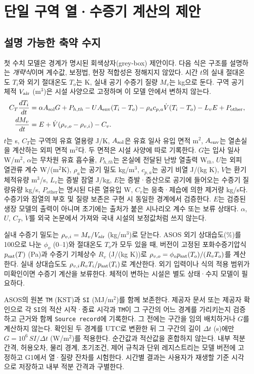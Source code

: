 \documentclass[11pt,a4paper]{article}
\begin{document}
\section{단일 구역 열·수증기 계산의 제안}
\subsection{설명 가능한 축약 수지}
첫 수치 모델은 경계가 명시된 회색상자(grey-box) 제안이다. 다음 식은 구조를 설명하는 \emph{개략식}이며 계수값, 보정법, 현장 적합성은 정해지지 않았다. 시간 $t$의 실내 절대온도 $T_i$와 외기 절대온도 $T_o$는 K, 실내 공기 수증기 질량 $M_v$는 kg으로 둔다. 구역 공기 체적 $V_{\rm air}$ (m$^3$)은 시설 사양으로 고정하며 이 모델 안에서 변하지 않는다.
\begin{align}
C_T\frac{dT_i}{dt}
 &= \alpha A_{\rm sol} G + P_{h,th} - U A_{\rm env}(T_i-T_o)
    - \rho_a c_{p,a}\dot V(T_i-T_o) - L_v E + P_{\mathrm{other}}, \label{eq:heat}\\
\frac{dM_v}{dt}
 &= E + \dot V(\rho_{v,o}-\rho_{v,i}) - C_v. \label{eq:vapor}
\end{align}
$t$는 s, $C_T$는 구역의 유효 열용량 J/K, $A_{\rm sol}$은 유효 일사 유입 면적 m$^2$, $A_{\rm env}$는 열손실을 계산하는 외피 면적 m$^2$다. 두 면적은 시설 사양에 따로 기록한다. $G$는 입사 일사 W/m$^2$, $\alpha$는 무차원 유효 흡수율, $P_{h,th}$는 온실에 전달된 난방 열출력 W$_{th}$, $U$는 외피 열관류 계수 W/(m$^2$K), $\rho_a$는 공기 밀도 kg/m$^3$, $c_{p,a}$는 공기 비열 J/(kg K), $\dot V$는 환기 체적유량 m$^3$/s, $L_v$는 증발 잠열 J/kg, $E$는 증발·증산으로 공기에 들어오는 수증기 질량유량 kg/s, $P_{\mathrm{other}}$는 명시된 다른 열유입 W, $C_v$는 응축·제습에 의한 제거량 kg/s다. 수증기와 잠열의 부호 및 질량 보존은 구현 시 동일한 경계에서 검증한다. $E$는 검증된 생장 모델의 출력이 아니며 초기에는 출처가 붙은 시나리오 계수 또는 보류 상태다. $\alpha$, $U$, $C_T$, $\dot V$를 외국 논문에서 가져와 국내 시설의 보정값처럼 쓰지 않는다.

실내 수증기 밀도는 $\rho_{v,i}=M_v/V_{\rm air}$ (kg/m$^3$)로 닫는다. ASOS 외기 상대습도(\%)를 100으로 나눈 $\phi_o$ (0--1)와 절대온도 $T_o$가 모두 있을 때, 버전이 고정된 포화수증기압식 $p_{\rm sat}(T)$ (Pa)과 수증기 기체상수 $R_v$ (J/(kg K))로 $\rho_{v,o}=\phi_o p_{\rm sat}(T_o)/(R_vT_o)$를 계산한다. 실내 상대습도도 $\rho_{v,i}R_vT_i/p_{\rm sat}(T_i)$로 계산한다. 외기 입력이나 식의 적용 범위가 미확인이면 수증기 계산을 보류한다. 체적이 변하는 시설은 별도 상태·수지 모델이 필요하다.

ASOS의 원본 \texttt{TM} (KST)과 \texttt{SI} (MJ/m$^2$)를 함께 보존한다\cite{kma-api}. 제공자 문서 또는 제공자 확인으로 각 \texttt{SI}의 적산 시작·종료 시각과 \texttt{TM}이 그 구간의 어느 경계를 가리키는지 검증하고 근거와 함께 \texttt{Source record}에 기록한다. 그 전에는 구간을 임의 배치하거나 $G$를 계산하지 않는다. 확인된 두 경계를 UTC로 변환한 뒤 그 구간의 길이 $\Delta t$ (s)에만 $G=10^6\,SI/\Delta t$ (W/m$^2$)를 적용한다. 순간값과 적산값을 혼합하지 않는다. 내부 적분 간격, 허용오차, 물리 경계, 초기조건, 제어 규칙과 단위 레지스트리는 모델 버전에 고정하고 G1에서 열·질량 잔차를 시험한다. 시간별 결과는 사용자가 재생할 기준 시각으로 저장하고 내부 적분 간격과 구별한다.
\end{document}
